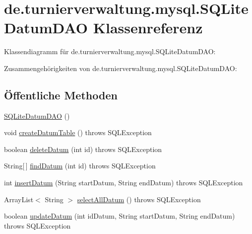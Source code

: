 \hypertarget{classde_1_1turnierverwaltung_1_1mysql_1_1_s_q_lite_datum_d_a_o}{}\section{de.\+turnierverwaltung.\+mysql.\+S\+Q\+Lite\+Datum\+D\+AO Klassenreferenz}
\label{classde_1_1turnierverwaltung_1_1mysql_1_1_s_q_lite_datum_d_a_o}


Klassendiagramm für de.\+turnierverwaltung.\+mysql.\+S\+Q\+Lite\+Datum\+D\+AO\+:


Zusammengehörigkeiten von de.\+turnierverwaltung.\+mysql.\+S\+Q\+Lite\+Datum\+D\+AO\+:
\subsection*{Öffentliche Methoden}
\begin{DoxyCompactItemize}
\item 
\hyperlink{classde_1_1turnierverwaltung_1_1mysql_1_1_s_q_lite_datum_d_a_o_a529ef6132b975acc6b15d2611d464311}{S\+Q\+Lite\+Datum\+D\+AO} ()
\item 
void \hyperlink{classde_1_1turnierverwaltung_1_1mysql_1_1_s_q_lite_datum_d_a_o_a4f59548635950a57c4f9a504734392c5}{create\+Datum\+Table} ()  throws S\+Q\+L\+Exception 
\item 
boolean \hyperlink{classde_1_1turnierverwaltung_1_1mysql_1_1_s_q_lite_datum_d_a_o_a380e4263464ded7445a12b2f697cea53}{delete\+Datum} (int id)  throws S\+Q\+L\+Exception 
\item 
String\mbox{[}$\,$\mbox{]} \hyperlink{classde_1_1turnierverwaltung_1_1mysql_1_1_s_q_lite_datum_d_a_o_a962c6c6a70f8325515571b5980892e81}{find\+Datum} (int id)  throws S\+Q\+L\+Exception 
\item 
int \hyperlink{classde_1_1turnierverwaltung_1_1mysql_1_1_s_q_lite_datum_d_a_o_a6bb3498feb2228a51650d44e5097c2cd}{insert\+Datum} (String start\+Datum, String end\+Datum)  throws S\+Q\+L\+Exception 
\item 
Array\+List$<$ String $>$ \hyperlink{classde_1_1turnierverwaltung_1_1mysql_1_1_s_q_lite_datum_d_a_o_a90ef7c1793085a6f50a9b9add5297357}{select\+All\+Datum} ()  throws S\+Q\+L\+Exception 
\item 
boolean \hyperlink{classde_1_1turnierverwaltung_1_1mysql_1_1_s_q_lite_datum_d_a_o_ab705007303b6a4d2eba08f6331e9a173}{update\+Datum} (int id\+Datum, String start\+Datum, String end\+Datum)  throws S\+Q\+L\+Exception 
\end{DoxyCompactItemize}


